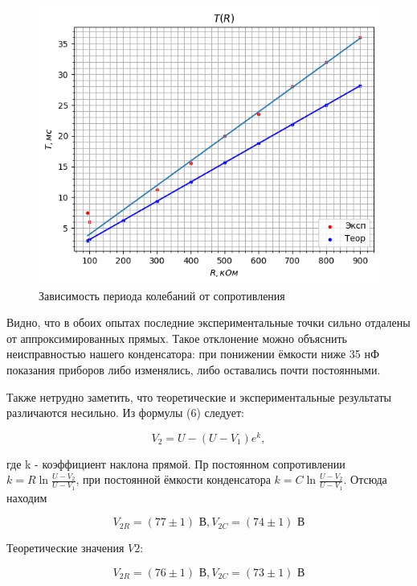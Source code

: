 \documentclass[a4paper,12pt]{article} %
\begin{document}
\begin{enumerate}
\begin{figure}[H]
    \centering
    \includegraphics[scale=0.7]{G22.png}
    \caption{Зависимость периода колебаний от сопротивления }
    \label{tc}
\end{figure}

Видно, что в обоих опытах последние экспериментальные точки сильно отдалены от аппроксимированных прямых. Такое отклонение можно объяснить неисправностью нашего конденсатора: при понижении ёмкости ниже 35 нФ показания приборов либо изменялись, либо оставались почти постоянными. 

Также нетрудно заметить, что теоретические и экспериментальные результаты различаются несильно. Из формулы (6) следует:

\begin{equation}
V_{2}=U-\left(U-V_{1}\right) e^{k},
\end{equation}

где k - коэффициент наклона прямой. Пр постоянном сопротивлении $k = R \ln \frac{U-V_{2}}{U-V_{1}}$, при постоянной ёмкости конденсатора $k = C \ln \frac{U-V_{2}}{U-V_{1}}$. Отсюда находим

\begin{equation}
V_{2R} = (77\pm1)\text{ В} , V_{2C} = (74\pm1)\text{ В}
\end{equation}


Теоретические значения $V2$:

\begin{equation}
V_{2R} = (76\pm1)\text{ В}, V_{2C} = (73\pm1)\text{ В}
\end{equation}


\end{enumerate}
\end{document}
